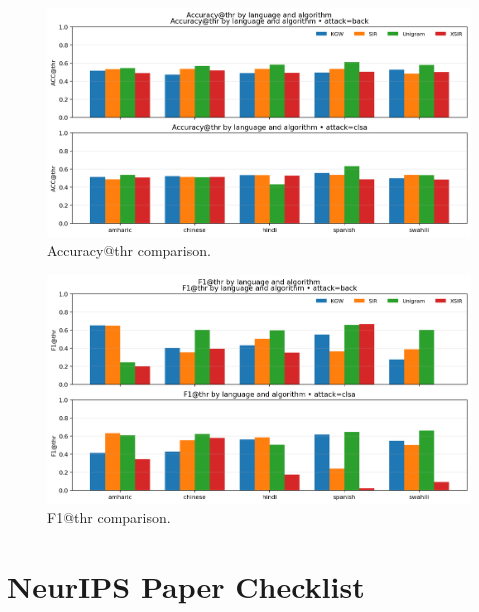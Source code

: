 \documentclass{article}
\begin{document}
%
\begin{figure}[h]
\centering
\includegraphics[width=\linewidth]{acc_bars.png}
\caption{Accuracy@thr comparison.}
\end{figure}
%
\begin{figure}[h]
\centering
\includegraphics[width=\linewidth]{f1_bars.png}
\caption{F1@thr comparison.}
\end{figure}



\clearpage
\section*{NeurIPS Paper Checklist}
\end{document}
